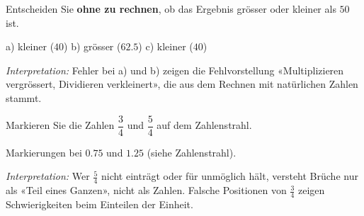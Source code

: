 \documentclass[11pt]{exam}
\newcommand{\aufgabe}[1]{%
  \needspace{8\baselineskip}%
  \renewcommand{\questionlabel}{\textbf{#1}}%
  \question}
\newcommand{\geteilt}{\mathbin{:}}
\newcommand{\wahl}[1]{\mbox{$\Box$\,#1}}
\newcommand{\wahlr}[1]{\mbox{\ifprintanswers$\blacksquare$\,\textbf{#1}\else$\Box$\,#1\fi}}
\newcommand{\diagnose}[1]{\par\smallskip\textit{Interpretation:} #1}
\begin{document}
\begin{questions}
\aufgabe{2.2}
Entscheiden Sie \textbf{ohne zu rechnen}, ob das Ergebnis grösser oder kleiner
als $50$ ist.
\begin{solution}
  a) kleiner ($40$) \quad b) grösser ($62.5$) \quad c) kleiner ($40$)
  \diagnose{Fehler bei a) und b) zeigen die Fehlvorstellung «Multiplizieren
  vergrössert, Dividieren verkleinert», die aus dem Rechnen mit natürlichen
  Zahlen stammt.}
\end{solution}

\aufgabe{3.1}
Markieren Sie die Zahlen $\dfrac{3}{4}$ und $\dfrac{5}{4}$ auf dem Zahlenstrahl.

\begin{center}
\end{center}
\begin{solution}
  Markierungen bei $0.75$ und $1.25$ (siehe Zahlenstrahl).
  \diagnose{Wer $\frac{5}{4}$ nicht einträgt oder für unmöglich hält, versteht
  Brüche nur als «Teil eines Ganzen», nicht als Zahlen. Falsche Positionen von
  $\frac{3}{4}$ zeigen Schwierigkeiten beim Einteilen der Einheit.}
\end{solution}


\end{questions}
\end{document}
